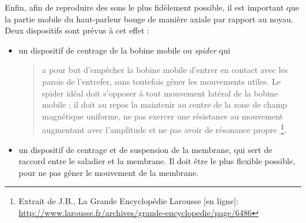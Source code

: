 Enfin, afin de reproduire des sons le plus fidèlement possible, il est important que la partie mobile du haut-parleur bouge de manière axiale par rapport au noyau.
Deux dispositifs sont prévus à cet effet \cite[p.~6486]{Larousse} : 
\begin{itemize}
\item un dispositif de centrage de la bobine mobile ou \textit{spider} qui \begin{quote} a pour but d’empêcher la bobine mobile d’entrer en contact avec les parois de l’entrefer, sans toutefois gêner les mouvements utiles. Le spider idéal doit s’opposer à tout mouvement latéral de la bobine mobile ; il doit au repos la maintenir au centre de la zone de champ magnétique uniforme, ne pas exercer une résistance au mouvement augmentant avec l’amplitude et ne pas avoir de résonance propre~\footnote{Extrait de J.B., \og La Grande Encyclopédie Larousse [en ligne]\fg : \url{http://www.larousse.fr/archives/grande-encyclopedie/page/6486}}.\end{quote}
\item un dispositif de centrage et de suspension de la membrane, qui sert de raccord entre le saladier et la membrane. Il doit être le plus flexible possible, pour ne pas gêner le mouvement de la membrane.
\end{itemize}






